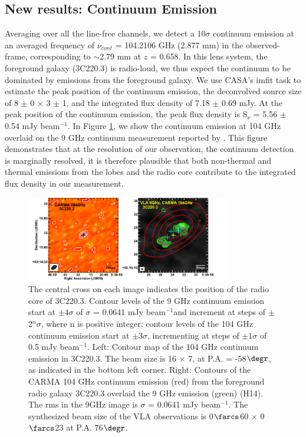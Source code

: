 \documentclass[twocolumn,apj,numberedappendix]{emulateapj}
\newcommand{\pmOne}{$^{-1}$}
\begin{document}
\subsection{New results: Continuum Emission} 
Averaging over all the line-free channels, we detect a 10$\sigma$ continuum emission at an averaged frequency of $\nu_{cont}$ = 104.2106 GHz (2.877 mm) in the observed-frame, corresponding to $\sim$2.79 mm at $z$ = 0.658. In this lens system, the 
foreground galaxy (3C220.3) is radio-loud, we thus expect the continuum to be dominated by emissions from the foreground galaxy. We use CASA's {\sc imfit} task to estimate the peak position of the continuum emission, the deconvolved source size of 8 $\pm$ 0 $\times$ 3 $\pm$ 1, and the integrated flux density of 7.18 $\pm$ 0.69 mJy. At the peak position of the continuum emission, the peak flux density is S$_\nu$ = 5.56 $\pm$ 0.54 
mJy beam\pmOne.
In Figure \ref{fig:cont}, we show the continuum emission at 104 GHz overlaid on the 9 GHz continuum measurement reported by \citet{Haas14}. This figure demonstrates that at the resolution of our observation, the continuum detection is marginally resolved, it is therefore plausible that both non-thermal and thermal emissions from the lobes and the radio core contribute to the integrated flux density in our measurement.

\begin{figure}[tbph]
\centering
\includegraphics[width=0.80\textwidth]{Figure/ContPanel}
\caption{The central cross on each image indicates the position of the radio core of 3C220.3. Contour levels of the 9 GHz continuum 
emission start at $\pm$4$\sigma$ of $\sigma$ = 0.0641 mJy beam\pmOne and increment at steps of $\pm$2$^n\sigma$, 
where n is positive integer; contour levels of the 104 GHz continuum emission start at $\pm$3$\sigma$, incrementing at steps 
of $\pm$1$\sigma$ of 0.5 mJy beam\pmOne.
Left: Contour map of the 104 GHz continuum emission in 3C220.3. The beam size is 16 $\times$ 7, at P.A. = 
-58$\degr$, as indicated in the bottom left corner. Right: Contours of the CARMA 104 GHz continuum emission (red) from the 
foreground radio galaxy 3C220.3 overlaid the 9 GHz emission (green) (H14). The rms in the 9GHz image is $\sigma$ 
= 0.0641 mJy beam\pmOne. The synthesized beam size of the VLA observations is 0$\farcs$60 $\times$ 0$\farcs$23 at P.A. 
76$\degr$. 
\label{fig:cont}}
\end{figure}
\end{document}
